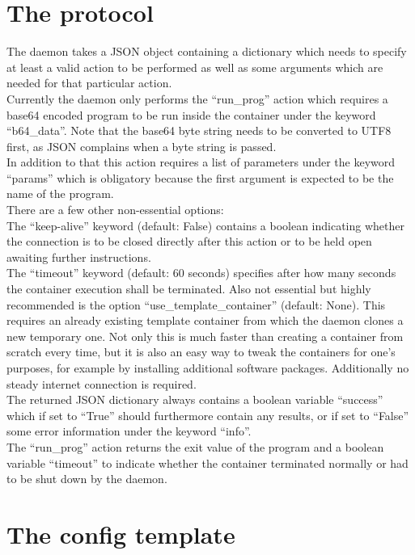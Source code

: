 \section{The protocol}

The daemon takes a JSON object containing a dictionary which needs to specify at least a valid action to
be performed as well as some arguments which are needed for that particular action.\\
Currently the daemon only performs the ``run\_prog'' action which requires a base64 encoded program to be run
inside the container under the keyword ``b64\_data''. Note that the base64 byte string needs to be converted to
UTF8 first, as JSON complains when a byte string is passed.\\
In addition to that this action requires a list of parameters under the keyword ``params'' which is obligatory
because the first argument is expected to be the name of the program.\\
There are a few other non-essential options:\\
The ``keep-alive'' keyword (default: False) contains a boolean indicating whether the connection is to be closed
directly after this action or to be held open awaiting further instructions.\\
The ``timeout'' keyword (default: 60 seconds) specifies after how many seconds the container execution shall be
terminated.
Also not essential but highly recommended is the option ``use\_template\_container'' (default: None). This
requires an already existing template container from which the daemon clones a new temporary one. Not only
this is much faster than creating a container from scratch every time, but it is also an easy way to tweak
the containers for one's purposes, for example by installing additional software packages. Additionally
no steady internet connection is required.\\
The returned JSON dictionary always contains a boolean variable ``success'' which if set to ``True'' should
furthermore contain any results, or if set to ``False'' some error information under the keyword ``info''.\\
The ``run\_prog'' action returns the exit value of the program and a boolean variable ``timeout'' to indicate
whether the container terminated normally or had to be shut down by the daemon.

\section{The config template}

